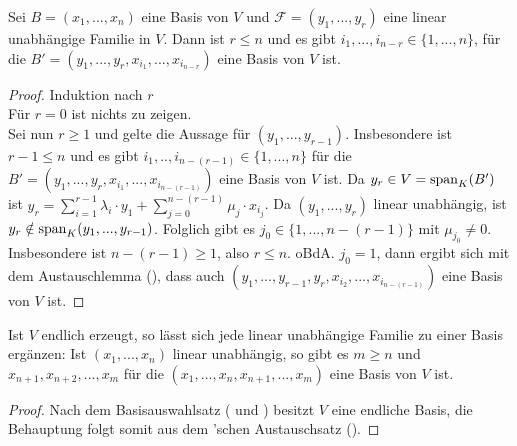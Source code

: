 \begin{theorem}
	Sei $B=(x_1,...,x_n)$ eine Basis von $V$ und $\mathcal F=(y_1,...
	,y_r)$ eine linear unabhängige Familie in $V$. Dann ist $r\le n$ und es gibt $i_1,...,i_{n-r} \in \{1,...,n\}$, für 
	die $B'=(y_1,...,y_r,x_{i_1},...,x_{i_{n-r}})$ eine Basis von $V$ ist. 
\end{theorem}
\begin{proof}
	Induktion nach $r$\\
	Für $r=0$ ist nichts zu zeigen. \\
	Sei nun $r\ge 1$ und gelte die Aussage für $(y_1,...,y_{r-1})$. Insbesondere ist $r-1\le n$ und es gibt $i_1,..,
	i_{n-(r-1)} \in \{1,...,n\}$ für die $B'=(y_1,...,y_r,x_{i_1},...,x_{i_{n-(r-1)}})$ eine Basis von $V$ ist. Da $y_r
	\in V=\operatorname{span}_K(B')$ ist $y_r=\sum_{i=1}^{r-1} \lambda_i\cdot y_1 + \sum_{j=0}^{n-(r-1)} \mu_j\cdot 
	x_{i_j}$. Da $(y_1,...,y_r)$ linear unabhängig, ist $y_r \notin \operatorname{span}_K(y_1,...,y_{r-1})$. Folglich gibt es $j_0 \in 
	\{1,...,n-(r-1)\}$ mit $\mu_{j_0}\neq 0$. Insbesondere ist $n-(r-1)\ge 1$, also $r\le n$. oBdA. $j_0=1$, dann 
	ergibt sich mit dem Austauschlemma (), dass auch $(y_1,...,y_{r-1},y_r,x_{i_2},...,x_{i_{n-(r-1)}})$ eine Basis von 
	$V$ ist.
\end{proof}

\begin{conclusion}[Basisergänzungssatz]
	Ist $V$ endlich erzeugt, so lässt sich jede linear unabhängige Familie zu einer Basis ergänzen: 
	Ist $(x_1,...,x_n)$ linear unabhängig, so gibt es $m\ge n$ und $x_{n+1},x_{n+2},...,x_m$ für die $(x_1,...,x_n,
	x_{n+1},...,x_m)$ eine Basis von $V$ ist.
\end{conclusion}
\begin{proof}
	Nach dem Basisauswahlsatz ( und ) besitzt $V$ eine endliche Basis, die Behauptung folgt somit aus dem 'schen Austauschsatz ().
\end{proof}